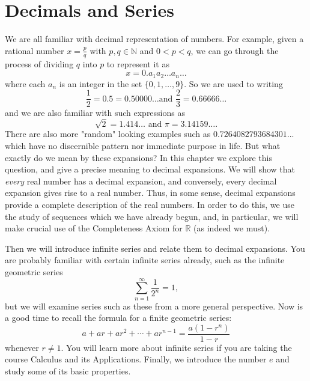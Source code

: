 \documentclass[11pt,dvipsnames]{book}
\numberwithin{equation}{section} %
\numberwithin{figure}{section} %
\numberwithin{table}{section} %
\begin{document}
%
%
%
%
%
%
%


\chapter{Decimals and Series}
We are all familiar with decimal representation of numbers. For example, given a rational number $x = \frac{p}{q}$ with $p, q \in \mathbb{N}$ and $0 < p < q$, we can go through the process of dividing $q$ into $p$ to represent it as 
\[ x = 0.a_1 a_2 \dots a_n \dots\]
where each $a_n$ is an integer in the set $\{0,1,\dots, 9\}$. So we are used to writing \[ \frac{1}{2} = 0.5 = 0.50000\dots \mbox{
and } \frac{2}{3} = 0.66666\dots\]
and we are also familiar with such expressions as 
\[ \sqrt{2} = 1.414\dots \mbox{ and } \pi = 3.14159 \dots. \]
There are also more "random" looking examples such as $0.7264082793684301...$ which have no discernible pattern nor immediate purpose in life. But what exactly do we mean by these expansions? In this chapter we explore this question, and give a precise meaning to decimal expansions. We will show that {\em every} real number has a decimal expansion, and conversely, every decimal expansion gives rise to a real number. Thus, in some sense, decimal expansions provide a complete description of the real numbers. In order to do this, we use the study of sequences which we have already begun, and, in particular, we will make crucial use of the Completeness Axiom for $\mathbb{R}$ (as indeed we must).

Then we will introduce infinite series and relate them to decimal expansions. You are probably familiar with certain infinite series already, such as the infinite geometric series
\[ \sum_{n=1}^\infty \frac{1}{2^n} = 1,\]
but we will examine series such as these from a more general perspective. Now is a good time to recall the formula for a finite geometric series: 
\[ a + ar + ar^2 + \cdots + ar^{n-1} = \frac{a(1-r^{n})}{1-r}\]
whenever $r \neq 1$. You will learn more about infinite series if you are taking the course Calculus and its Applications. Finally, we introduce the number $e$ and study some of its basic properties.
\end{document}
